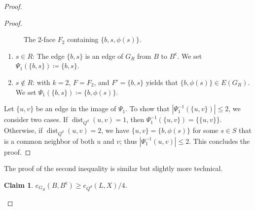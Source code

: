 \documentclass[11pt,a4paper,oneside,reqno]{amsart}
\newtheorem{claim}[theorem]{Claim}
\DeclareMathOperator{\dist}{dist}
\begin{document}
\begin{proof}
\begin{proof}
\begin{figure}[h]
{\hfil}
      \caption{The $2$-face $F_2$ containing $\{b,s,\phi(s)\}$.}
      \label{fig:fig2}
    \end{figure}

    \begin{enumerate}[label=(\roman*)]
    \item
      \underline{$s\in R$}:
      The edge $\{b,s\}$ is an edge of $G_R$ from $B$ to $B^\mathsf{c}$.  We set $\Psi_1(\{b,s\}) \coloneqq \{b,s\}$.
    \item
      \underline{$s\notin R$}:
       with $k=2$, $F=F_2$, and $F'=\{b,s\}$ yields that $\{b,\phi(s)\} \in E(G_R)$. We set $\Psi_1(\{b,s\}) \coloneqq \{b,\phi(s)\}$.
    \end{enumerate}

    Let $\{u,v\}$ be an edge in the image of $\Psi_1$.
    To show that $|\Psi_1^{-1}(\{u,v\})|\leq 2$, we consider two cases.
    If $\dist_{Q^d}(u,v)=1$, then $\Psi_1^{-1}(\{u,v\}) = \{\{u,v\}\}$.
    Otherwise, if $\dist_{Q^d}(u,v)=2$, we have $\{u,v\} = \{b,\phi(s)\}$ for some $s\in S$ that is a common neighbor of both $u$ and $v$;  thus $|\Psi_1^{-1}(u,v)|\leq 2$.
    This concludes the proof.
  \end{proof}

  The proof of the second inequality is similar but slightly more technical.

  \begin{claim}
    $e_{G_R}(B,B^{\mathsf{c}}) \ge e_{Q^d}(L,X)/4$.
  \end{claim}


\end{proof}
\end{document}

